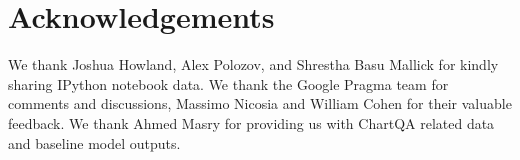 \section*{Acknowledgements}
We thank Joshua Howland, Alex Polozov, and Shrestha Basu Mallick for kindly sharing IPython notebook data. We thank the Google Pragma team for comments and discussions, Massimo Nicosia and William Cohen for their valuable feedback. We thank Ahmed Masry for providing us with ChartQA related data and baseline model outputs.
